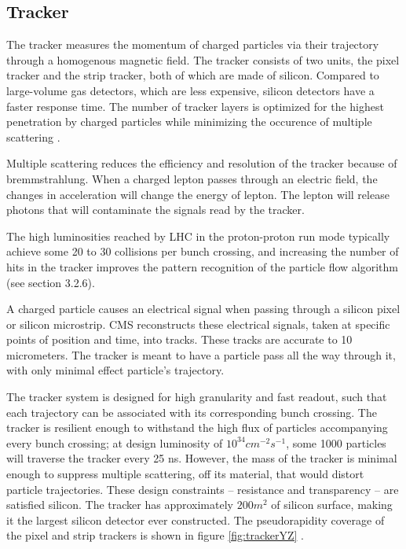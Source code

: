 \subsection{Tracker}

The tracker measures the momentum of charged particles via their trajectory through a homogenous magnetic field. The tracker consists of two units, the pixel tracker and the strip tracker, both of which are made of silicon. Compared to large-volume gas detectors, which are less expensive, silicon detectors have a faster response time. The number of tracker layers is optimized for the highest penetration by charged particles while minimizing the occurence of multiple scattering \cite{cmsTdrTrk}. 

Multiple scattering reduces the efficiency and resolution of the tracker because of bremmstrahlung. When a charged lepton passes through an electric field, the changes in acceleration will change the energy of lepton. The lepton will release photons that will contaminate the signals read by the tracker. 

The high luminosities reached by LHC in the proton-proton run mode typically achieve some 20 to 30 collisions per bunch crossing, and increasing the number of hits in the tracker improves the pattern recognition of the particle flow algorithm (see section 3.2.6).

A charged particle causes an electrical signal when passing through a silicon pixel or silicon microstrip. CMS reconstructs these electrical signals, taken at specific points of position and time, into tracks. These tracks are accurate to 10 micrometers. The tracker is meant to have  a particle pass all the way through it, with only minimal effect particle's trajectory. 

The tracker system is designed for high granularity and fast readout, such that each trajectory can be associated with its corresponding bunch crossing. The tracker is resilient enough to withstand the high flux of particles accompanying every bunch crossing; at design luminosity of $10^{34} cm^{-2} s^{-1}$, some 1000 particles will traverse the tracker every 25 ns. However, the mass of the tracker is minimal enough to suppress multiple scattering, off its material, that would distort particle trajectories. These design constraints -- resistance and transparency -- are satisfied silicon. The tracker has approximately $200 m^2$ of silicon surface, making it the largest silicon detector ever constructed. The pseudorapidity coverage of the pixel and strip trackers is shown in figure \ref{fig:trackerYZ} \cite{Chatrchyan:2009sr}.

